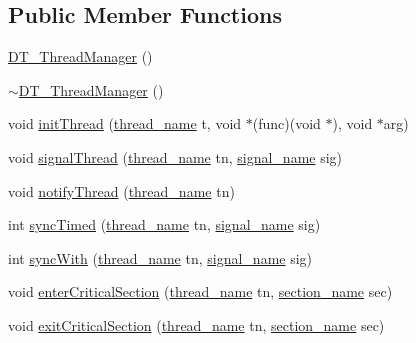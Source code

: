 \subsection*{Public Member Functions}
\begin{DoxyCompactItemize}
\item 
\hyperlink{class_d_t___thread_manager_a86af9f88b74723e4beb11a2712fc886e}{DT\_\-ThreadManager} ()
\item 
\hyperlink{class_d_t___thread_manager_a61ffab6d5cb0f849ddd3d2520fd69977}{$\sim$DT\_\-ThreadManager} ()
\item 
void \hyperlink{class_d_t___thread_manager_a1f08551848fe9b3e01c8575190bcd2b6}{initThread} (\hyperlink{dt__thread__manager_8hpp_a628f2b964813f31419ba9c2430c9b5fb}{thread\_\-name} t, void $\ast$(func)(void $\ast$), void $\ast$arg)
\item 
void \hyperlink{class_d_t___thread_manager_a47ec8fd514dd8abcc48765207b448b73}{signalThread} (\hyperlink{dt__thread__manager_8hpp_a628f2b964813f31419ba9c2430c9b5fb}{thread\_\-name} tn, \hyperlink{dt__thread__manager_8hpp_a361fdb317b7b93d2f291dc427f1862cc}{signal\_\-name} sig)
\item 
void \hyperlink{class_d_t___thread_manager_a9e4b737f0d47fd133023c117b44c2855}{notifyThread} (\hyperlink{dt__thread__manager_8hpp_a628f2b964813f31419ba9c2430c9b5fb}{thread\_\-name} tn)
\item 
int \hyperlink{class_d_t___thread_manager_aa8d8e388e11f0c3ecc8f7491dc53ca08}{syncTimed} (\hyperlink{dt__thread__manager_8hpp_a628f2b964813f31419ba9c2430c9b5fb}{thread\_\-name} tn, \hyperlink{dt__thread__manager_8hpp_a361fdb317b7b93d2f291dc427f1862cc}{signal\_\-name} sig)
\item 
int \hyperlink{class_d_t___thread_manager_adbab3141f1f3d1361673561aef9bfa79}{syncWith} (\hyperlink{dt__thread__manager_8hpp_a628f2b964813f31419ba9c2430c9b5fb}{thread\_\-name} tn, \hyperlink{dt__thread__manager_8hpp_a361fdb317b7b93d2f291dc427f1862cc}{signal\_\-name} sig)
\item 
void \hyperlink{class_d_t___thread_manager_a1890fa094ae872fb2ce0fb15a97447ee}{enterCriticalSection} (\hyperlink{dt__thread__manager_8hpp_a628f2b964813f31419ba9c2430c9b5fb}{thread\_\-name} tn, \hyperlink{dt__thread__manager_8hpp_a7cccada68fcdab42984f95781f489ca0}{section\_\-name} sec)
\item 
void \hyperlink{class_d_t___thread_manager_abc92eae259720a889d8b1e180cda5fd4}{exitCriticalSection} (\hyperlink{dt__thread__manager_8hpp_a628f2b964813f31419ba9c2430c9b5fb}{thread\_\-name} tn, \hyperlink{dt__thread__manager_8hpp_a7cccada68fcdab42984f95781f489ca0}{section\_\-name} sec)
\end{DoxyCompactItemize}


